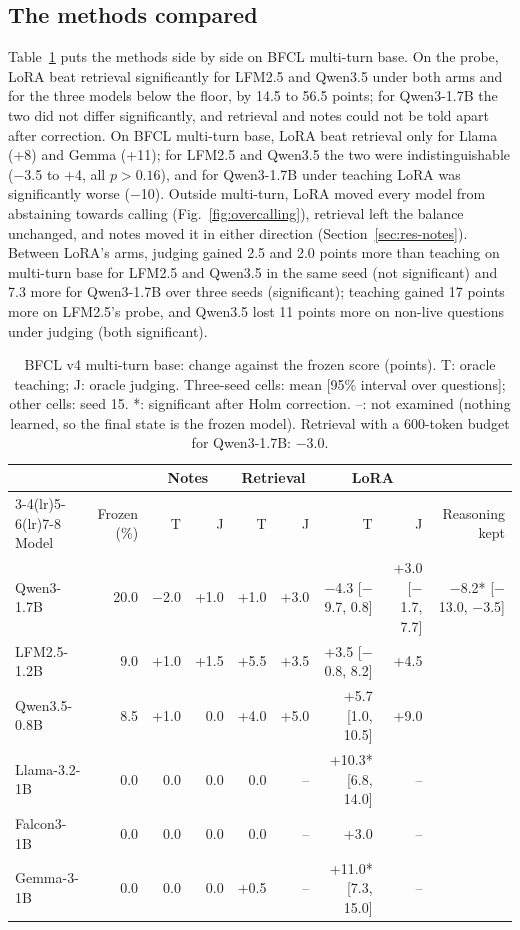 \documentclass[a4paper,fleqn]{cas-dc}
\begin{document}
\subsection{The methods compared}\label{sec:bfcl}
Table~\ref{tab:bfcl} puts the methods side by side on BFCL multi-turn base. On the probe, LoRA beat retrieval
significantly for LFM2.5 and Qwen3.5 under both arms and for the three models below the floor, by 14.5 to 56.5 points; for
Qwen3-1.7B the two did not differ significantly, and retrieval and notes could not be told apart after correction. On BFCL multi-turn base, LoRA
beat retrieval only for Llama (+8) and Gemma (+11); for LFM2.5 and Qwen3.5 the two were indistinguishable ($-$3.5 to
+4, all $p>0.16$), and for Qwen3-1.7B under teaching LoRA was significantly worse ($-$10). Outside multi-turn, LoRA moved
every model from abstaining towards calling (Fig.~\ref{fig:overcalling}), retrieval left the balance unchanged, and notes moved it in either direction (Section~\ref{sec:res-notes}). Between LoRA's arms, judging gained 2.5 and 2.0
points more than teaching on multi-turn base for LFM2.5 and Qwen3.5 in the same seed (not significant) and 7.3 more for
Qwen3-1.7B over three seeds (significant); teaching gained 17 points more on LFM2.5's probe, and Qwen3.5 lost 11 points
more on non-live questions under judging (both significant).

\begin{table}[t]
\centering
\caption{BFCL v4 multi-turn base: change against the frozen score (points). T: oracle teaching; J: oracle judging. Three-seed
cells: mean [95\% interval over questions]; other cells: seed 15. *: significant after Holm correction. --: not examined
(nothing learned, so the final state is the frozen model). Retrieval with a 600-token budget for Qwen3-1.7B: $-$3.0.}
\label{tab:bfcl}
\small
\begin{tabular}{lrrrrrrrr}
\toprule
& & \multicolumn{2}{c}{Notes} & \multicolumn{2}{c}{Retrieval} & \multicolumn{2}{c}{LoRA} & \\
\cmidrule(lr){3-4}\cmidrule(lr){5-6}\cmidrule(lr){7-8}
Model & Frozen (\%) & T & J & T & J & T & J & Reasoning kept \\
\midrule
Qwen3-1.7B   & 20.0 & $-$2.0 & +1.0 & +1.0 & +3.0 & $-$4.3 [$-$9.7, 0.8] & +3.0 [$-$1.7, 7.7] & $-$8.2* [$-$13.0, $-$3.5] \\
LFM2.5-1.2B  &  9.0 & +1.0 & +1.5 & +5.5 & +3.5 & +3.5 [$-$0.8, 8.2] & +4.5 & \\
Qwen3.5-0.8B &  8.5 & +1.0 &  0.0 & +4.0 & +5.0 & +5.7 [1.0, 10.5] & +9.0 & \\
Llama-3.2-1B &  0.0 &  0.0 &  0.0 &  0.0 & -- & +10.3* [6.8, 14.0] & -- & \\
Falcon3-1B   &  0.0 &  0.0 &  0.0 &  0.0 & -- & +3.0 & -- & \\
Gemma-3-1B   &  0.0 &  0.0 &  0.0 & +0.5 & -- & +11.0* [7.3, 15.0] & -- & \\
\bottomrule
\end{tabular}
\end{table}
\end{document}

